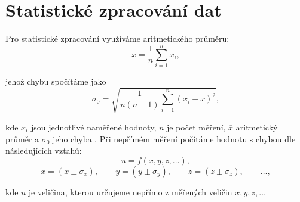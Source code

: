 \documentclass[english]{article}
\begin{document}
\section{Statistické zpracování dat}
	Pro statistické zpracování využíváme aritmetického průměru:
	\begin{equation} \label{eq:aritmeticky_prumer}
	\overline{x} = \frac{1}{n}\sum\limits_{i=1}^{n}x_i,
	\end{equation}

%	
	
	
	jehož chybu spočítáme jako 
	\begin{equation} \label{eq:chyba_aritmetickeho_prumeru}
	\sigma_0 = \sqrt{\frac{1}{n(n-1)} \sum\limits_{i=1}^{n}\left( x_i - \overline{x} \right)^2 },
	\end{equation}
	
	kde $ x_i $ jsou jednotlivé naměřené hodnoty, $ n $ je počet měření, $ \overline{x} $ aritmetický průměr a $ \sigma_0 $ jeho chyba \cite{bib:chyby}.
%	
Při nepřímém měření počítáme hodnotu s chybou dle následujících vztahů:
	\begin{equation}
	u = f(x, y, z, \ldots),
	\end{equation}
	\begin{displaymath}
	x = (\overline{x} \pm \sigma_x), \qquad
	y = (\overline{y} \pm \sigma_y), \qquad
	z = (\overline{z} \pm \sigma_z), \qquad
	\ldots,
	\end{displaymath}
	
	kde $ u $ je veličina, kterou určujeme nepřímo z měřených veličin $ x, y, z, \ldots $ 
	
\end{document}

